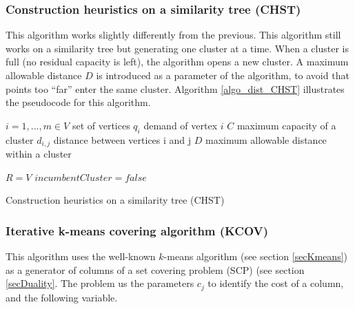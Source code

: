\subsubsection{Construction heuristics on a similarity tree (CHST)}
This algorithm works slightly differently from the previous. This algorithm still works on a similarity tree but generating one cluster at a time. When a cluster is full (no residual capacity is left), the algorithm opens a new cluster. A maximum allowable distance $D$ is introduced as a parameter of the algorithm, to avoid that points too “far” enter the same cluster. Algorithm \ref{algo_dist_CHST} illustrates the pseudocode for this algorithm.

\begin{algorithm}[H]
\DontPrintSemicolon
\SetAlgoLined

$i = 1,...,m \in V$ set of vertices\;
$q_i$ demand of vertex $i$\;
$C$ maximum capacity of a cluster \;
$d_{i,j}$ distance between vertices i and j \;
$D$ maximum allowable distance within a cluster \;

$R=V$ \;
$incumbentCluster=false$ \;


\caption{Construction heuristics on a similarity tree (CHST)}
\label{algo_dist_CHST}       

\end{algorithm}


\subsubsection{Iterative k-means covering algorithm (KCOV)} \label{secKCOV}
This algorithm uses the well-known $k$-means algorithm (see section \ref{secKmeans}) as a generator of columns of a set covering problem (SCP) (see section \ref{secDuality}. The problem us the parameters $c_j$ to identify the cost of a column, and the following variable.

